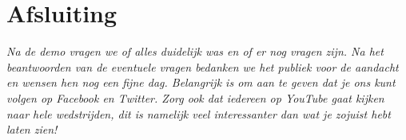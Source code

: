 \documentclass[a4paper,10pt]{article}
\numberwithin{equation}{section}
\numberwithin{figure}{section}
\numberwithin{table}{section}
\begin{document}
\section*{Afsluiting}
\textit{Na de demo vragen we of alles duidelijk was en of er nog vragen zijn. Na het beantwoorden van de eventuele vragen bedanken we het publiek voor de aandacht en wensen hen nog een fijne dag. Belangrijk is om aan te geven dat je ons kunt volgen op Facebook en Twitter. Zorg ook dat iedereen op YouTube gaat kijken naar hele wedstrijden, dit is namelijk veel interessanter dan wat je zojuist hebt laten zien!}
\end{document}
